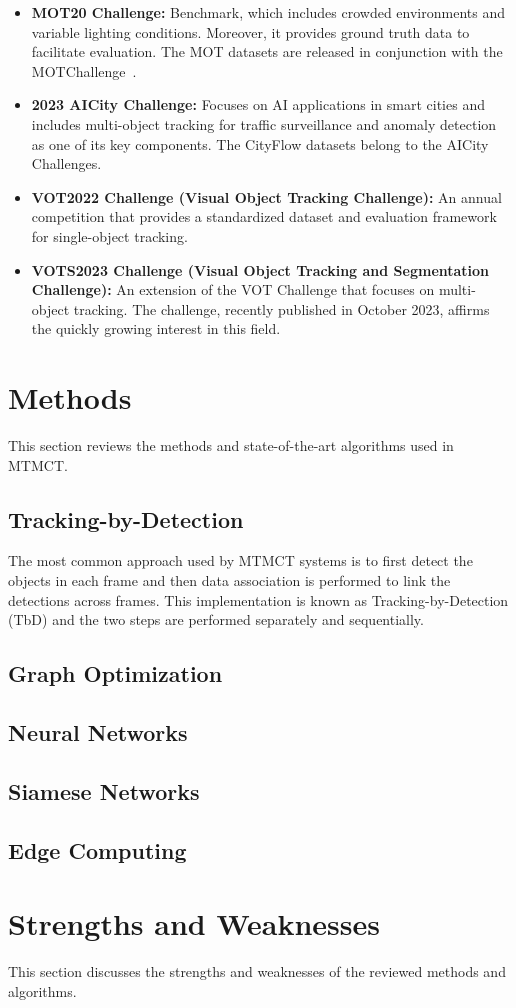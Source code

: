 \begin{itemize}
    \item \textbf{MOT20 Challenge:} Benchmark, which includes crowded environments and variable lighting conditions. Moreover, it provides ground truth data to facilitate evaluation. The MOT datasets are released in conjunction with the MOTChallenge~\cite{Dendorfer20}.
    \item \textbf{2023 AICity Challenge:} Focuses on AI applications in smart cities and includes multi-object tracking for traffic surveillance and anomaly detection as one of its key components. The CityFlow datasets belong to the AICity Challenges.~\cite{Naphade23}
    \item \textbf{VOT2022 Challenge (Visual Object Tracking Challenge):} An annual competition that provides a standardized dataset and evaluation framework for single-object tracking.~\cite{Kristan22}
    \item \textbf{VOTS2023 Challenge (Visual Object Tracking and Segmentation Challenge):} An extension of the VOT Challenge that focuses on multi-object tracking. The challenge, recently published in October 2023, affirms the quickly growing interest in this field.~\cite{Kristan23}
\end{itemize}

\section{Methods}\label{sec:methods}
This section reviews the methods and state-of-the-art algorithms used in MTMCT.

\subsection{Tracking-by-Detection}\label{subsec:tracking_by_detection}
The most common approach used by MTMCT systems is to first detect the objects in each frame and then data association is performed to link the detections across frames. This implementation is known as Tracking-by-Detection (TbD) and the two steps are performed separately and sequentially.

\subsection{Graph Optimization}\label{subsec:graph_optimization}


\subsection{Neural Networks}\label{subsec:neural_networks}


\subsection{Siamese Networks}\label{subsec:siamese_networks}


\subsection{Edge Computing}\label{subsec:edge_computing}

\section{Strengths and Weaknesses}\label{sec:strengths_and_weaknesses}
This section discusses the strengths and weaknesses of the reviewed methods and algorithms.
